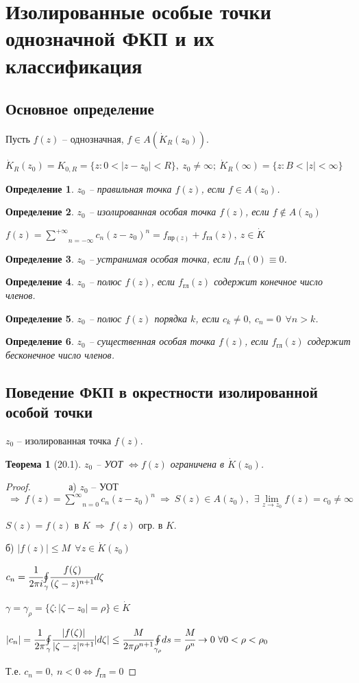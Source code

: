 \documentclass[draft]{report}
\newcommand{\forcenewline}{$\phantom{\mbox{newline}}$\newline}
\newcommand{\then}{\ \Rightarrow\ }
\newcommand{\moint}[1]{\underset{#1}{\oint}}
\newcommand{\msum}[2]{\underset{#1}{\overset{#2}{\sum}}}
\newcommand{\ssum}{\msum{n=0}{\infty}}
\newcommand{\lsum}{\msum{n=-\infty}{+\infty}}
\newcommand{\mlim}[1]{\underset{#1}{\lim}}
\newcommand{\LRA}{\Leftrightarrow}
\newcommand{\g}{\gamma}
\newcommand{\E}{\ \exists}
\newcommand{\F}{\ \forall}
\newcommand{\opr}[1]{\begin{opred}#1\end{opred}}
\newtheorem*{theor}{Теорема}
\newtheorem*{opred}{Определение}
\theoremstyle{remark}
\begin{document}
\section{Изолированные особые точки однозначной ФКП и их классификация}

\subsection{Основное определение}

Пусть $f(z)$ -- однозначная, $f\in A(\dot{K}_R(z_0))$.

$\dot{K}_R(z_0)=K_{0,R}=\{z\colon0<|z-z_0|<R\},\ z_0\neq\infty;\ \dot{K}_R(\infty)=\{z\colon B<|z|<\infty\}$
\opr{$z_0$ -- правильная точка $f(z)$, если $f\in A(z_0)$.}
\opr{$z_0$ -- изолированная особая точка $f(z)$, если $f\not\in A(z_0)$}
$f(z)=\lsum c_n(z-z_0)^n=f_{\mbox{пр}(z)}+f_{\mbox{гл}}(z),\ z\in\dot{K}$
\opr{$z_0$ -- устранимая особая точка, если $f_{\mbox{гл}}(0)\equiv0$.}
\opr{$z_0$ -- полюс $f(z)$, если $f_{\mbox{гл}}(z)$ содержит конечное число членов.}
\opr{$z_0$ -- полюс $f(z)$ порядка $k$, если $c_k\neq0,\ c_n=0\ \F n>k$.}
\opr{$z_0$ -- существенная особая точка $f(z)$, если $f_{\mbox{гл}}(z)$ содержит бесконечное число членов.}

\subsection{Поведение ФКП в окрестности изолированной особой точки}

$z_0$ -- изолированная точка $f(z)$.
\begin{theor}[20.1]
$z_0$ -- УОТ $\LRA f(z)$ ограничена в $\dot{K}(z_0)$.
\end{theor}
\begin{proof}
\forcenewline
а) $z_0$ -- УОТ $\then f(z)=\ssum c_n(z-z_0)^n\then S(z)\in A(z_0),\ \E \mlim{z\to z_0}f(z)=c_0\neq\infty$

$S(z)=f(z)$ в $K \then f(z)$ огр. в $K$.

б) $|f(z)|\leq M\ \F z\in\dot{K}(z_0)$

$c_n=\cfrac{1}{2\pi i}\moint{\gamma}\cfrac{f(\zeta)}{(\zeta-z)^{n+1}}d\zeta$

$\g=\g_\rho=\{\zeta\colon|\zeta-z_0|=\rho\}\in\dot{K}$

$|c_n|=\cfrac{1}{2\pi}\moint{\gamma}\cfrac{|f(\zeta)|}{|\zeta-z|^{n+1}}|d\zeta|\leq \cfrac{M}{2\pi\rho^{n+1}}\moint{\g_\rho}ds=\cfrac{M}{\rho^n}\to0 \F0<\rho<\rho_0$

Т.е. $c_n=0,\ n<0\LRA f_{\mbox{гл}}=0$
\end{proof}
\end{document}
